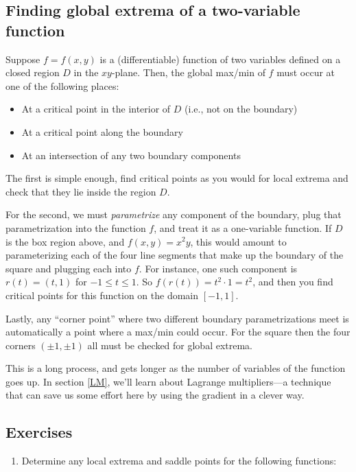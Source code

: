 \documentclass[12pt]{article}
\numberwithin{equation}{subsection}
\numberwithin{figure}{subsection}
\theoremstyle{note}
\begin{document}
{\subsection{Finding global extrema of a two-variable function}Suppose $f=f(x,y)$ is a (differentiable) function of two variables defined on a closed region $D$ in the $xy$-plane. Then, the global max/min of $f$ must occur at one of the following places:

\begin{itemize}
	\item At a critical point in the interior of $D$ (i.e., not on the boundary)
	\item At a critical point along the boundary
	\item At an intersection of any two boundary components
\end{itemize}

The first is simple enough, find critical points as you would for local extrema and check that they lie inside the region $D$. 

For the second, we must \textit{parametrize} any component of the boundary, plug that parametrization into the function $f$, and treat it as a one-variable function. If $D$ is the box region above, and $f(x,y)=x^2y$, this would amount to parameterizing each of the four line segments that make up the boundary of the square and plugging each into $f$. For instance, one such component is $r(t)=(t,1)$ for $-1\leq t\leq 1$. So $f(r(t))=t^2\cdot 1=t^2$, and then you find critical points for this function on the domain $[-1,1]$. 

Lastly, any ``corner point'' where two different boundary parametrizations meet is automatically a point where a max/min could occur. For the square then the four corners $(\pm 1, \pm 1)$ all must be checked for global extrema. 


This is a long process, and gets longer as the number of variables of the function goes up. In section \ref{LM}, we'll learn about Lagrange multipliers---a technique that can save us some effort here by using the gradient in a clever way.

\subsection{Exercises}
\begin{enumerate}[label=\arabic*.]
\item Determine any local extrema and saddle points for the following functions:


\end{enumerate}}
\end{document}
